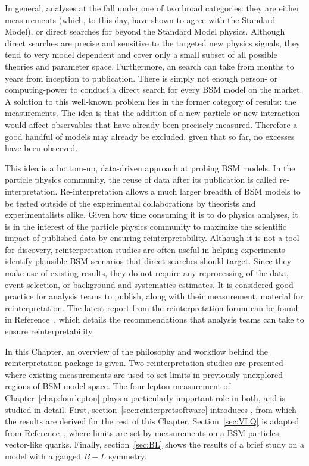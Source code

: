 In general, analyses at the \LHC fall under one of two broad categories: they are either measurements (which, to this day, have shown to agree with the Standard Model), or direct searches for beyond the Standard Model physics. Although direct searches are precise and sensitive to the targeted new physics signals, they tend to very model dependent and cover only a small subset of all possible theories and parameter space. Furthermore, an \LHC search can take from months to years from inception to publication. There is simply not enough person- or computing-power to conduct a direct search for every BSM model on the market. A solution to this well-known problem lies in the former category of \LHC results: the measurements. The idea is that the addition of a new particle or new interaction would affect observables that have already been precisely measured. Therefore a good handful of models may already be excluded, given that so far, no excesses have been observed. 

This idea is a bottom-up, data-driven approach at probing BSM models. In the particle physics community, the reuse of data after its publication is called re-interpretation. Re-interpretation allows a much larger breadth of BSM models to be tested outside of the experimental collaborations by theorists and experimentalists alike. Given how time consuming it is to do physics analyses, it is in the interest of the particle physics community to maximize the scientific impact of published data by ensuring reinterpretability. Although it is not a tool for discovery, reinterpretation studies are often useful in helping experiments identify plausible BSM scenarios that direct searches should target. Since they make use of existing results, they do not require any reprocessing of the data, event selection, or background and systematics estimates. It is considered good practice for analysis teams to publish, along with their measurement, material for reinterpretation. The latest report from the \LHC reinterpretation forum can be found in Reference~\cite{Abdallah:2020pec}, which details the recommendations that analysis teams can take to ensure reinterpretability.

In this Chapter, an overview of the philosophy and workflow behind the \contur reinterpretation package is given. Two reinterpretation studies are presented where existing \LHC measurements are used to set limits in previously unexplored regions of BSM model space. The \ATLAS four-lepton measurement of Chapter~\ref{chap:fourlepton} plays a particularly important role in both, and is studied in detail. First, section~\ref{sec:reinterpretsoftware} introduces \contur, from which the results are derived for the rest of this Chapter. Section~\ref{sec:VLQ} is adapted from Reference~\cite{VLQ_contur}, where limits are set by \LHC measurements on a BSM particles vector-like quarks. Finally, section~\ref{sec:BL} shows the results of a brief study on a model with a gauged $B-L$ symmetry.

